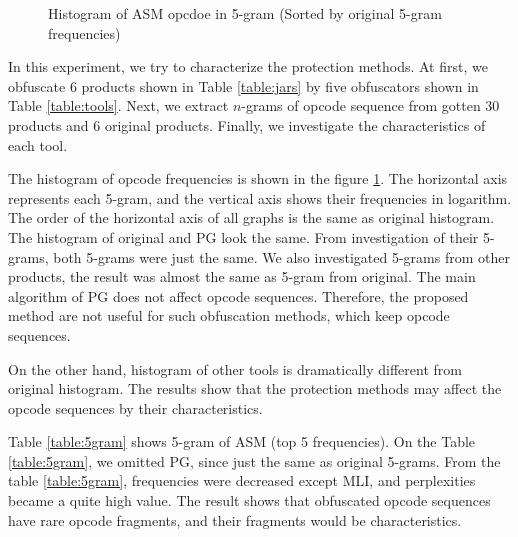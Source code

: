 \documentclass[conference]{IEEEtran}
\begin{document}
\begin{figure}[bt]
\begin{minipage}[b]{0.48\linewidth}
    \label{fig:asm-5gram-PG-histogram}%
  \end{minipage}
  \caption{Histogram of ASM opcdoe in 5-gram (Sorted by original 5-gram frequencies)}
  \label{fig:asm-5gram-histogram}
\end{figure}

In this experiment, we try to characterize the protection methods.  At
first, we obfuscate 6 products shown in Table \ref{table:jars} by five
obfuscators shown in Table \ref{table:tools}.  Next, we extract
$n$-grams of opcode sequence from gotten 30 products and 6 original
products.  Finally, we investigate the characteristics of each tool.

The histogram of opcode frequencies is shown in the figure
\ref{fig:asm-5gram-histogram}.  The horizontal axis represents each
5-gram, and the vertical axis shows their frequencies in logarithm.
The order of the horizontal axis of all graphs is the same as original
histogram.
%
The histogram of original and PG look the same.  From investigation
of their 5-grams, both 5-grams were just the same.  We also
investigated 5-grams from other products, the result was almost the
same as 5-gram from original.  The main algorithm of PG does not
affect opcode sequences.  Therefore, the proposed method are not
useful for such obfuscation methods, which keep opcode sequences.

On the other hand, histogram of other tools is dramatically different
from original histogram.  The results show that the protection methods
may affect the opcode sequences by their characteristics.

Table \ref{table:5gram} shows 5-gram of ASM (top 5 frequencies).  On
the Table \ref{table:5gram}, we omitted PG, since just the same as
original 5-grams.  From the table \ref{table:5gram}, frequencies were
decreased except MLI, and perplexities became a quite high value.  The
result shows that obfuscated opcode sequences have rare opcode
fragments, and their fragments would be characteristics.
\end{document}
